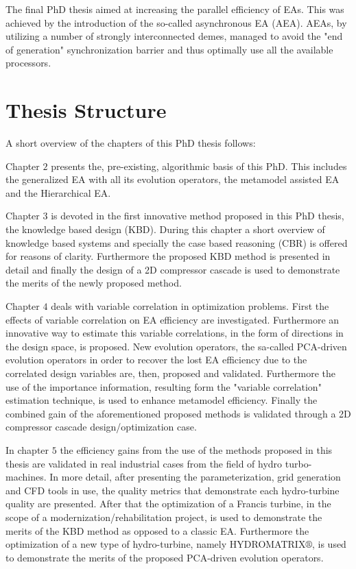 The final PhD thesis \cite{phd_Vera} aimed at increasing the parallel efficiency of EAs. This was achieved by the introduction of the so-called asynchronous EA (AEA). AEAs,  by utilizing a number of strongly interconnected demes, managed to avoid the "end of generation" synchronization barrier and thus optimally use all the available processors.    

\section{Thesis Structure} %
A short overview of the chapters of this PhD thesis follows:

Chapter $2$ presents the, pre-existing, algorithmic basis of this PhD. This includes the generalized EA with all its evolution operators, the metamodel assisted EA and the Hierarchical EA.

Chapter $3$ is devoted in the first innovative method proposed in this PhD thesis, the knowledge based design (KBD). During this chapter a short overview of knowledge based systems and specially the case based reasoning (CBR) is offered for reasons of clarity. Furthermore the proposed KBD method is presented in detail and finally the design of a 2D compressor cascade is used to demonstrate the merits of the newly proposed method.

Chapter $4$ deals with variable correlation in optimization problems. First the effects of variable correlation on EA efficiency are investigated. Furthermore an innovative way to estimate this variable correlations, in the form of directions in the design space, is proposed.   New evolution operators, the sa-called PCA-driven evolution operators in order to recover the lost EA efficiency due to the correlated design variables are, then, proposed and validated. Furthermore the use of the importance information, resulting form the "variable correlation" estimation technique, is used to enhance metamodel efficiency. Finally the combined gain of the aforementioned proposed methods is validated through a 2D compressor cascade design/optimization case.

In chapter $5$ the efficiency gains from the use of the methods proposed in this thesis are validated in real industrial cases from the field of hydro turbo-machines. In more detail, after presenting the parameterization, grid generation and CFD tools in use, the quality metrics that demonstrate each hydro-turbine quality are presented. After that the optimization of a Francis turbine, in the scope of a modernization/rehabilitation project, is used to demonstrate the merits of the KBD method as opposed to a classic EA. Furthermore the optimization of a new type of hydro-turbine, namely HYDROMATRIX$\circledR$, is used to demonstrate the merits of the proposed PCA-driven evolution operators.


